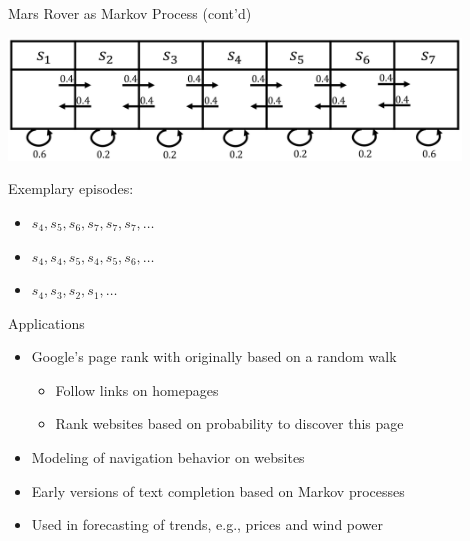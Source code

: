 \begin{frame}[c]{Mars Rover as Markov Process (cont'd)}
	
	\begin{center}
	\includegraphics[width=0.9\textwidth]{images/mars_rover_markov_process_2.png}
	\end{center}
	
	\bigskip
	Exemplary episodes:
	\begin{itemize}
		\item $s_4, s_5, s_6, s_7, s_7, s_7, \ldots$
		\item $s_4, s_4, s_5, s_4, s_5, s_6, \ldots$
		\item $s_4, s_3, s_2, s_1, \ldots$
	\end{itemize}
	
\end{frame}
\begin{frame}[c]{Applications}

	\begin{itemize}
		\item Google's page rank with originally based on a random walk 
		\begin{itemize}
			\item Follow links on homepages
			\item Rank websites based on probability to discover this page
		\end{itemize}
		\pause
		\smallskip
		\item Modeling of navigation behavior on websites
		\pause
		\medskip
		\item Early versions of text completion based on Markov processes
		\pause
		\medskip
		\item Used in forecasting of trends, e.g., prices and wind power
	\end{itemize}	
	
\end{frame}


